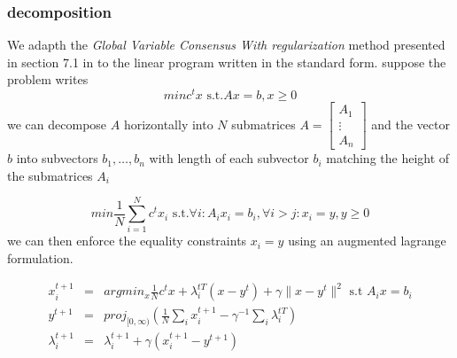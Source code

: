 \documentclass[11pt]{article}
\begin{document}
\subsubsection{decomposition}
We adapth the \textit{Global Variable Consensus With regularization} method  presented in section 7.1 in \cite{Boyd2010} to the linear program written in the standard form.
suppose the problem writes 
\begin{equation}
min c^t x \text{ s.t.} Ax= b,x \geq 0 
\end{equation}
we can decompose $A$ horizontally into $N$ submatrices 
$A=\left[\begin{array}{c}A_1\\ \vdots\\ A_n\end{array}\right]$ 
and the vector $b$ into subvectors $b_1,\dots,b_n$ with length of each subvector $b_i$ matching the height of the submatrices $A_i$

\begin{equation}
min \frac{1}{N}\sum_{i=1}^N c^t x_i \text{ s.t.} \forall i : A_i x_i= b_i , \forall i>j: x_i=y, y\geq 0
\end{equation}
we can then enforce the equality constraints $x_i=y$ using an augmented lagrange formulation. 

\begin{eqnarray}
x_i^{t+1}&=&argmin_x  \frac{1}{N}c^tx +\lambda_i^{tT} (x-y^t)+\gamma\|x-y^t\|^2 \text{ s.t } A_ix=b_i\\
y^{t+1}&=&proj_{[0,\infty)} (\frac{1}{N}\sum_i x_i^{t+1}-\gamma^{-1} \sum_i \lambda_i^{tT} )\\
\lambda_i^{t+1}&=&\lambda_i^{t+1}+\gamma(x_i^{t+1}-y^{t+1})
\end{eqnarray}
\end{document}
